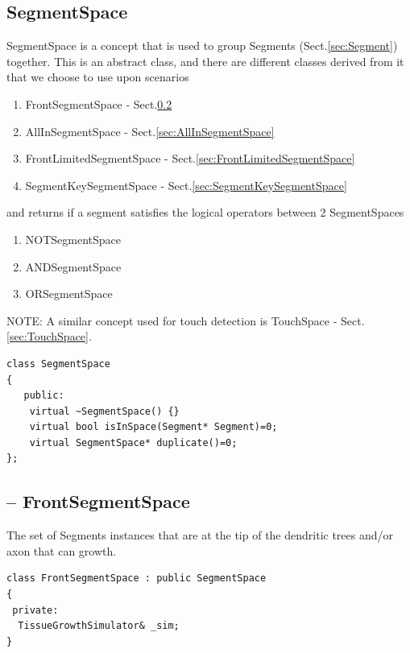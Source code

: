 \subsection{SegmentSpace}
\label{sec:SegmentSpace}

SegmentSpace is a concept that is used to group Segments
(Sect.\ref{sec:Segment}) together. This is an abstract class, and there are
different classes derived from it that we choose to use upon scenarios
\begin{enumerate}
  \item FrontSegmentSpace - Sect.\ref{sec:FrontSegmentSpace}
  
  \item AllInSegmentSpace - Sect.\ref{sec:AllInSegmentSpace}
  
  \item FrontLimitedSegmentSpace - Sect.\ref{sec:FrontLimitedSegmentSpace}

  \item SegmentKeySegmentSpace - Sect.\ref{sec:SegmentKeySegmentSpace}
\end{enumerate}
and returns if a segment satisfies the logical operators between 2
SegmentSpaces
\begin{enumerate}
  \item NOTSegmentSpace 
  \item ANDSegmentSpace
  \item ORSegmentSpace  
\end{enumerate}

NOTE: A similar concept used for touch detection is TouchSpace -
Sect.\ref{sec:TouchSpace}.

\begin{verbatim}
class SegmentSpace
{
   public:
    virtual ~SegmentSpace() {}
    virtual bool isInSpace(Segment* Segment)=0;
    virtual SegmentSpace* duplicate()=0;
};
\end{verbatim}

\subsection{-- FrontSegmentSpace}
\label{sec:FrontSegmentSpace}

The set of Segments instances that are at the tip of the dendritic trees and/or
axon that can growth.

\begin{verbatim}
class FrontSegmentSpace : public SegmentSpace
{
 private:
  TissueGrowthSimulator& _sim;
}
\end{verbatim}

